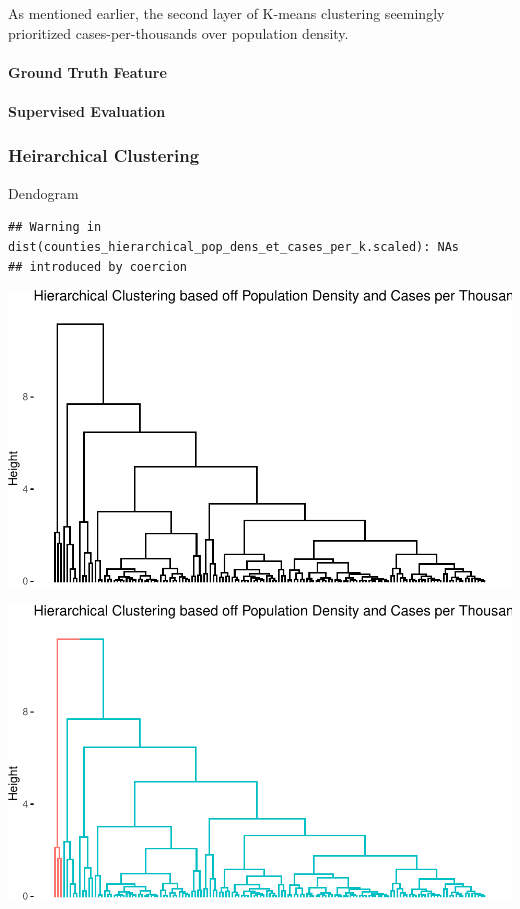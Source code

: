 \documentclass[
]{article}
\begin{document}
As mentioned earlier, the second layer of K-means clustering seemingly
prioritized cases-per-thousands over population density.

\paragraph{Ground Truth Feature}\label{ground-truth-feature-2}

\paragraph{Supervised Evaluation}\label{supervised-evaluation-2}

\subsubsection{Heirarchical Clustering}\label{heirarchical-clustering-1}

Dendogram

\begin{verbatim}
## Warning in dist(counties_hierarchical_pop_dens_et_cases_per_k.scaled): NAs
## introduced by coercion
\end{verbatim}

\includegraphics{Final-Report_files/figure-latex/unnamed-chunk-16-1.pdf}

\includegraphics{Final-Report_files/figure-latex/unnamed-chunk-17-1.pdf}
\end{document}
